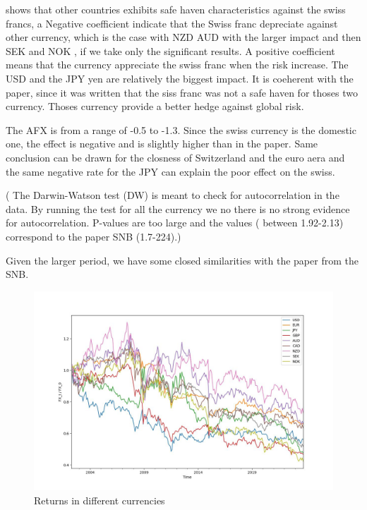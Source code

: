 \documentclass[a4paper,11pt,oneside]{article}
\begin{document}
shows that other countries exhibits safe haven characteristics against the swiss francs, a Negative coefficient indicate that the Swiss franc depreciate against other currency, which is the case with NZD AUD with the larger impact and then SEK and NOK , if we take only the significant results. A positive coefficient means that the currency  appreciate the swiss franc when the risk increase. The USD and the JPY yen are relatively the biggest impact. It is coeherent with the paper, since it was written that the siss franc was not a safe haven for thoses two currency. Thoses currency provide a better hedge against global risk.

The AFX is from a range of -0.5 to -1.3. Since the swiss currency is the domestic one, the effect is negative and is slightly higher than in the paper. Same conclusion can be drawn for the closness of Switzerland and the euro aera and the same negative rate for the JPY can explain the poor effect on the swiss.

( The Darwin-Watson test (DW) is meant to check for autocorrelation in the data. By running the test for all the currency we no there is no strong evidence for autocorrelation. P-values are too large and the values ( between 1.92-2.13)  correspond to the paper SNB (1.7-224).)

Given the larger period, we have some closed similarities with the paper from the SNB.
\begin{figure}[h]
    \centering
    \includegraphics[width=\textwidth]{figures/ccy_perfs.jpg}
    \caption{Returns in different currencies}
    \label{fig:}
\end{figure}
\end{document}
